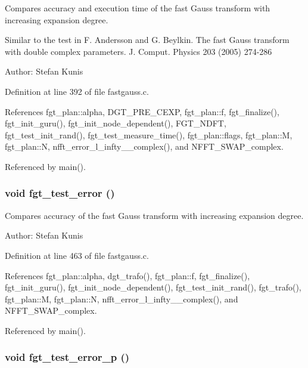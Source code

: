 Compares accuracy and execution time of the fast Gauss transform with increasing expansion degree. 

Similar to the test in F. Andersson and G. Beylkin. The fast Gauss transform with double complex parameters. J. Comput. Physics 203 (2005) 274-286

\begin{Desc}
\item[Author:]Stefan Kunis \end{Desc}


Definition at line 392 of file fastgauss.c.

References fgt\_\-plan::alpha, DGT\_\-PRE\_\-CEXP, fgt\_\-plan::f, fgt\_\-finalize(), fgt\_\-init\_\-guru(), fgt\_\-init\_\-node\_\-dependent(), FGT\_\-NDFT, fgt\_\-test\_\-init\_\-rand(), fgt\_\-test\_\-measure\_\-time(), fgt\_\-plan::flags, fgt\_\-plan::M, fgt\_\-plan::N, nfft\_\-error\_\-l\_\-infty\_\_\-complex(), and NFFT\_\-SWAP\_\-complex.

Referenced by main().\hypertarget{group__applications__fastgauss_ga10}{
\subsubsection[fgt\_\-test\_\-error]{\setlength{\rightskip}{0pt plus 5cm}void fgt\_\-test\_\-error ()}}
\label{group__applications__fastgauss_ga10}


Compares accuracy of the fast Gauss transform with increasing expansion degree. 

\begin{Desc}
\item[Author:]Stefan Kunis \end{Desc}


Definition at line 463 of file fastgauss.c.

References fgt\_\-plan::alpha, dgt\_\-trafo(), fgt\_\-plan::f, fgt\_\-finalize(), fgt\_\-init\_\-guru(), fgt\_\-init\_\-node\_\-dependent(), fgt\_\-test\_\-init\_\-rand(), fgt\_\-trafo(), fgt\_\-plan::M, fgt\_\-plan::N, nfft\_\-error\_\-l\_\-infty\_\_\-complex(), and NFFT\_\-SWAP\_\-complex.

Referenced by main().\hypertarget{group__applications__fastgauss_ga11}{
\subsubsection[fgt\_\-test\_\-error\_\-p]{\setlength{\rightskip}{0pt plus 5cm}void fgt\_\-test\_\-error\_\-p ()}}
\label{group__applications__fastgauss_ga11}



